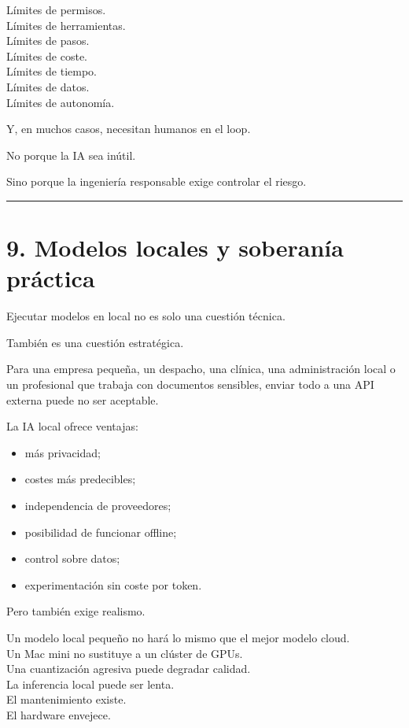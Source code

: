 Límites de permisos.\\
Límites de herramientas.\\
Límites de pasos.\\
Límites de coste.\\
Límites de tiempo.\\
Límites de datos.\\
Límites de autonomía.

Y, en muchos casos, necesitan humanos en el loop.

No porque la IA sea inútil.

Sino porque la ingeniería responsable exige controlar el riesgo.

\begin{center}\rule{0.5\linewidth}{0.5pt}\end{center}

\section{9. Modelos locales y soberanía
práctica}\label{modelos-locales-y-soberanuxeda-pruxe1ctica}

Ejecutar modelos en local no es solo una cuestión técnica.

También es una cuestión estratégica.

Para una empresa pequeña, un despacho, una clínica, una administración
local o un profesional que trabaja con documentos sensibles, enviar todo
a una API externa puede no ser aceptable.

La IA local ofrece ventajas:

\begin{itemize}
\tightlist
\item
  más privacidad;
\item
  costes más predecibles;
\item
  independencia de proveedores;
\item
  posibilidad de funcionar offline;
\item
  control sobre datos;
\item
  experimentación sin coste por token.
\end{itemize}

Pero también exige realismo.

Un modelo local pequeño no hará lo mismo que el mejor modelo cloud.\\
Un Mac mini no sustituye a un clúster de GPUs.\\
Una cuantización agresiva puede degradar calidad.\\
La inferencia local puede ser lenta.\\
El mantenimiento existe.\\
El hardware envejece.

